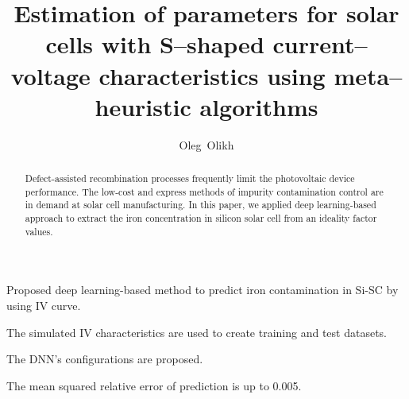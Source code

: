\documentclass[a4paper,fleqn]{cas-dc}
\begin{document}
\let\WriteBookmarks\relax
\def\floatpagepagefraction{1}
\def\textpagefraction{.001}



\title [mode = title]{Estimation of parameters for solar cells with S--shaped current--voltage characteristics using meta--heuristic algorithms}

%
\author{Oleg~Olikh}




\begin{abstract}
Defect-assisted recombination processes frequently
limit the photovoltaic device performance.
The low-cost and express methods of impurity contamination control
are in demand at solar cell manufacturing.
In this paper, we applied deep learning-based
approach to extract the iron concentration in silicon solar cell from an
ideality factor values.
\end{abstract}


\begin{highlights}
\item Proposed deep learning-based method to predict iron contamination in Si-SC by using IV curve.
\item The simulated IV characteristics are used to create training and test datasets.
\item The DNN's configurations are proposed.
\item The mean squared relative error of prediction is up to 0.005.
\end{highlights}
\end{document}

